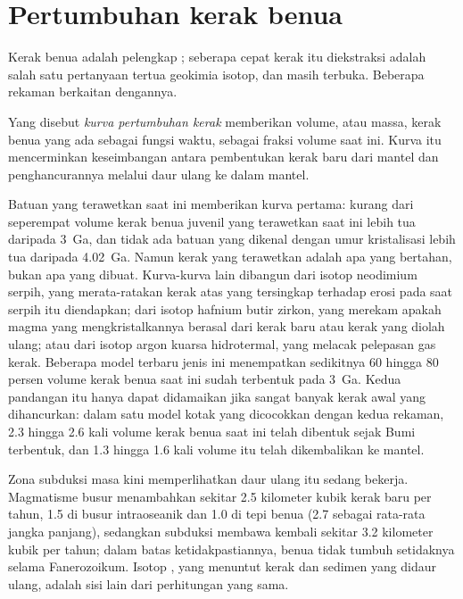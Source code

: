 \section{Pertumbuhan kerak benua}

Kerak benua adalah pelengkap ; seberapa cepat kerak itu
diekstraksi adalah salah satu pertanyaan tertua geokimia isotop, dan masih
terbuka. Beberapa rekaman berkaitan dengannya.

\begin{definition}\label{def:b2:isotope-geochemistry:growth}
Yang disebut \emph{kurva pertumbuhan kerak} memberikan volume, atau
massa, kerak benua yang ada sebagai fungsi waktu, sebagai fraksi
volume saat ini. Kurva itu mencerminkan keseimbangan antara pembentukan kerak baru
dari mantel dan penghancurannya melalui daur ulang ke dalam mantel.
\end{definition}

Batuan yang terawetkan saat ini memberikan kurva pertama: kurang dari seperempat volume
kerak benua juvenil yang terawetkan saat ini lebih tua daripada \qty{3}{Ga}, dan
tidak ada batuan yang dikenal dengan umur kristalisasi lebih tua daripada \qty{4.02}{Ga}. Namun
kerak yang terawetkan adalah apa yang bertahan, bukan apa yang dibuat. Kurva-kurva lain dibangun dari
isotop neodimium serpih, yang merata-ratakan kerak atas yang tersingkap terhadap
erosi pada saat serpih itu diendapkan; dari isotop hafnium butir
zirkon, yang merekam apakah magma yang mengkristalkannya berasal dari kerak baru atau
kerak yang diolah ulang; atau dari isotop argon kuarsa hidrotermal, yang melacak
pelepasan gas kerak. Beberapa model terbaru jenis ini menempatkan sedikitnya 60
hingga 80 persen volume kerak benua saat ini sudah terbentuk pada
\qty{3}{Ga}. Kedua pandangan itu hanya dapat didamaikan jika sangat banyak kerak awal
yang dihancurkan: dalam satu model kotak yang dicocokkan dengan kedua rekaman, 2.3 hingga 2.6 kali
volume kerak benua saat ini telah dibentuk sejak Bumi terbentuk,
dan 1.3 hingga 1.6 kali volume itu telah dikembalikan ke mantel.

Zona subduksi masa kini memperlihatkan daur ulang itu sedang bekerja. Magmatisme busur menambahkan
sekitar 2.5 kilometer kubik kerak baru per tahun, 1.5 di busur intraoseanik dan
1.0 di tepi benua (2.7 sebagai rata-rata jangka panjang), sedangkan subduksi membawa
kembali sekitar 3.2 kilometer kubik per tahun; dalam batas ketidakpastiannya,
benua tidak tumbuh setidaknya selama Fanerozoikum. Isotop , yang menuntut kerak dan sedimen yang didaur ulang, adalah sisi lain dari
perhitungan yang sama.


